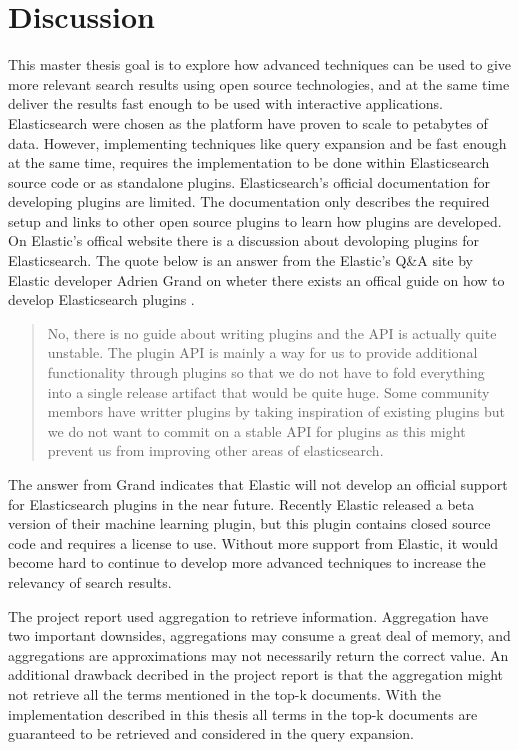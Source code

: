 \section{Discussion}
\label{sec:discussion}
This master thesis goal is to explore how advanced techniques can be used to give more relevant search results using open source technologies,
and at the same time deliver the results fast enough to be used with interactive applications.
Elasticsearch were chosen as the platform have proven to scale to petabytes of data.
However,
implementing techniques like query expansion and be fast enough at the same time,
requires the implementation to be done within Elasticsearch source code or as standalone plugins.
Elasticsearch's official documentation \cite{elasticsearch-plugin-documentation} for developing plugins are limited.
The documentation only describes the required setup and links to other open source plugins to learn how plugins are developed.
On Elastic's offical website there is a discussion about devoloping plugins for Elasticsearch.
The quote below is an answer from the Elastic's Q\&A site by Elastic developer Adrien Grand on wheter there exists an offical guide on how to develop Elasticsearch plugins \cite{elasticsearch-plugin-quote}.

\begin{quote}
  No, there is no guide about writing plugins and the API is actually quite unstable.
  The plugin API is mainly a way for us to provide additional functionality through plugins so that we do not have to fold everything into a single release artifact that would be quite huge.
  Some community membors have writter plugins by taking inspiration of existing plugins but we do not want to commit on a stable API for plugins as this might prevent us from improving other areas of elasticsearch.
\end{quote}

The answer from Grand indicates that Elastic will not develop an official support for Elasticsearch plugins in the near future.
Recently Elastic released a beta version of their machine learning plugin,
but this plugin contains closed source code and requires a license to use.
Without more support from Elastic,
it would become hard to continue to develop more advanced techniques to increase the relevancy of search results.

The project report \cite{project-report} used aggregation to retrieve information.
Aggregation have two important downsides,
aggregations may consume a great deal of memory,
and aggregations are approximations may not necessarily return the correct value.
An additional drawback decribed in the project report is that the aggregation might not retrieve all the terms mentioned in the top-k documents.
With the implementation described in this thesis all terms in the top-k documents are guaranteed to be retrieved and considered in the query expansion.


